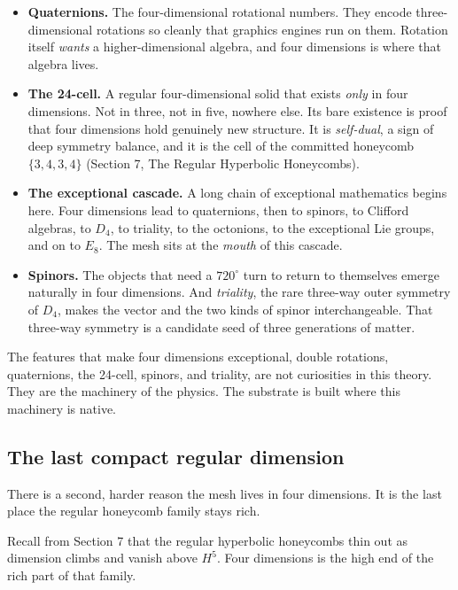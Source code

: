 \begin{itemize}
\item \textbf{Quaternions.} The four-dimensional rotational numbers. They encode three-dimensional rotations so cleanly that graphics engines run on them. Rotation itself \emph{wants} a higher-dimensional algebra, and four dimensions is where that algebra lives.
\item \textbf{The 24-cell.} A regular four-dimensional solid that exists \emph{only} in four dimensions. Not in three, not in five, nowhere else. Its bare existence is proof that four dimensions hold genuinely new structure. It is \emph{self-dual}, a sign of deep symmetry balance, and it is the cell of the committed honeycomb $\{3,4,3,4\}$ (Section 7, The Regular Hyperbolic Honeycombs).
\item \textbf{The exceptional cascade.} A long chain of exceptional mathematics begins here. Four dimensions lead to quaternions, then to spinors, to Clifford algebras, to $D_4$, to triality, to the octonions, to the exceptional Lie groups, and on to $E_8$. The mesh sits at the \emph{mouth} of this cascade.
\item \textbf{Spinors.} The objects that need a $720^\circ$ turn to return to themselves emerge naturally in four dimensions. And \emph{triality}, the rare three-way outer symmetry of $D_4$, makes the vector and the two kinds of spinor interchangeable. That three-way symmetry is a candidate seed of three generations of matter.
\end{itemize}

\begin{principle}
The features that make four dimensions exceptional, double rotations, quaternions, the 24-cell, spinors, and triality, are not curiosities in this theory. They are the machinery of the physics. The substrate is built where this machinery is native.
\end{principle}

\subsection{The last compact regular dimension}

There is a second, harder reason the mesh lives in four dimensions. It is the last place the regular honeycomb family stays rich.

Recall from Section 7 that the regular hyperbolic honeycombs thin out as dimension climbs and vanish above $H^5$. Four dimensions is the high end of the rich part of that family.

